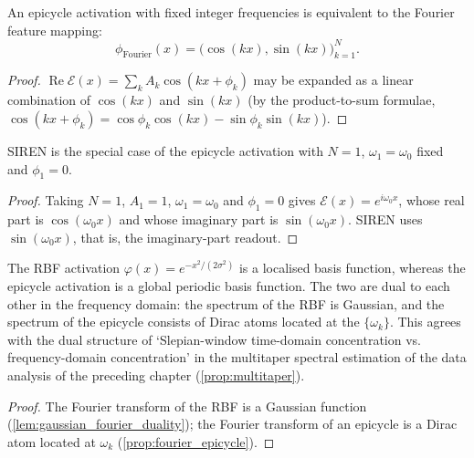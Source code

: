 \begin{proposition}\label{prop:fourier-features}
An epicycle activation with fixed integer frequencies is equivalent to the Fourier feature mapping:
\[
\phi_{\mathrm{Fourier}}(x)=\bigl(\cos(kx),\sin(kx)\bigr)_{k=1}^{N}.
\]
\end{proposition}

\begin{proof}
$\operatorname{Re}\mathcal E(x)=\sum_k A_k\cos(kx+\phi_k)$ may be expanded as a linear combination of $\cos(kx)$ and $\sin(kx)$ (by the product-to-sum formulae, $\cos(kx+\phi_k)=\cos\phi_k\cos(kx)-\sin\phi_k\sin(kx)$).
\end{proof}

\begin{proposition}\label{prop:siren-relation}
SIREN is the special case of the epicycle activation with $N=1$, $\omega_1=\omega_0$ fixed and $\phi_1=0$.
\end{proposition}

\begin{proof}
Taking $N=1$, $A_1=1$, $\omega_1=\omega_0$ and $\phi_1=0$ gives $\mathcal E(x)=e^{i\omega_0 x}$, whose real part is $\cos(\omega_0 x)$ and whose imaginary part is $\sin(\omega_0 x)$. SIREN uses $\sin(\omega_0 x)$, that is, the imaginary-part readout.
\end{proof}

\begin{proposition}\label{prop:rbf-wavelet-relation}
The RBF activation $\varphi(x)=e^{-x^2/(2\sigma^2)}$ is a localised basis function, whereas the epicycle activation is a global periodic basis function. The two are dual to each other in the frequency domain: the spectrum of the RBF is Gaussian, and the spectrum of the epicycle consists of Dirac atoms located at the $\{\omega_k\}$. This agrees with the dual structure of `Slepian-window time-domain concentration vs. frequency-domain concentration' in the multitaper spectral estimation of the data analysis of the preceding chapter (\cref{prop:multitaper}).
\end{proposition}

\begin{proof}
The Fourier transform of the RBF is a Gaussian function (\cref{lem:gaussian_fourier_duality}); the Fourier transform of an epicycle is a Dirac atom located at $\omega_k$ (\cref{prop:fourier_epicycle}).
\end{proof}

